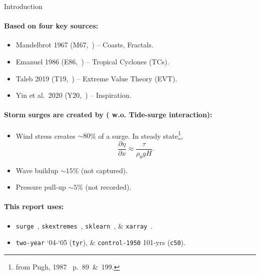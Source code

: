 
\begin{frame}{Introduction}

\vspace{-20pt}
\paragraph{Based on four key sources:}
\begin{itemize}
\item Mandelbrot 1967 (M67,~\cite{mandelbrot1967long}) -- Coasts, Fractals.
\item Emanuel 1986 (E86,~\cite{emanuel1986air}) -- Tropical Cyclones (TCs).
\item Taleb 2019 (T19,~\cite{taleb2019statistical}) -- Extreme Value Theory (EVT).
\item Yin et al.~2020 (Y20,~\cite{ZannaPreprint}) -- Inspiration.
\end{itemize}
\paragraph{Storm surges are created by ( w.o. Tide-surge interaction):}
\begin{itemize}
\item  Wind stress creates $\sim 80$\% of a surge. In steady state\footnote{from Pugh, 1987~\cite{pugh1987tides} p.~89~\&~199.},
\begin{equation}
\frac{\partial \eta}{\partial x}
\approx \frac{\tau}{\rho_{0} g H}.
\label{eq:pugh}
\end{equation}
\item Wave buildup $\sim 15$\% (not captured).
\item Pressure pull-up $\sim 5$\% (not recorded).
\end{itemize}
\paragraph{This report uses:}
\begin{itemize}
\item \texttt{surge}~\cite{gitlab}, \texttt{skextremes}~\cite{skextremes},
      \texttt{sklearn}~\cite{scikit-learn}, \& \texttt{xarray}~\cite{hoyer2017xarray}.
\item \texttt{two-year} `04-`05 (\texttt{tyr}), \&  \texttt{control-1950} 101-yrs (\texttt{c50}).
\end{itemize}

\end{frame}



